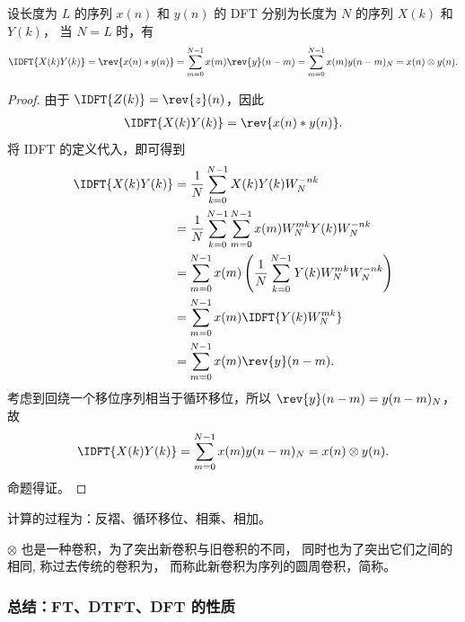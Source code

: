 \begin{property}
    设长度为 $L$ 的序列 $x(n)$ 和 $y(n)$ 的 DFT 分别为长度为 $N$ 的序列 $X(k)$ 和 $Y(k)$，
    当 $N = L$ 时，有
    \begin{align*}
        \IDFT{X(k)Y(k)} = \rev{x(n) * y(n)}
        = \sum_{m = 0}^{N - 1}x(m)\rev{y}(n - m)
        = \sum_{m = 0}^{N - 1}x(m)y(n - m)_N = x(n) \otimes y(n).
    \end{align*}
\end{property}

\begin{proof}
    由于 $\IDFT{Z(k)} = \rev{z}(n)$，因此
    \begin{align*}
        \IDFT{X(k)Y(k)} = \rev{x(n) * y(n)}.
    \end{align*}
    将 IDFT 的定义代入，即可得到
    \begin{align*}
        \IDFT{X(k)Y(k)} & = \frac{1}{N}\sum_{k = 0}^{N - 1}X(k)Y(k)W_N^{-nk} \\
        & = \frac{1}{N}\sum_{k = 0}^{N - 1}\sum_{m = 0}^{N - 1}x(m)W_N^{mk}Y(k)W_N^{-nk} \\
        & = \sum_{m = 0}^{N - 1}x(m)\left(\frac{1}{N}\sum_{k = 0}^{N - 1}Y(k)W_N^{mk}W_N^{-nk}\right) \\
        & = \sum_{m = 0}^{N - 1}x(m)\IDFT{Y(k)W_N^{mk}} \\
        & = \sum_{m = 0}^{N - 1}x(m)\rev{y}(n - m).
    \end{align*}
    考虑到回绕一个移位序列相当于循环移位，所以 $\rev{y}(n - m) = y(n - m)_N$，故
    \begin{align*}
        \IDFT{X(k)Y(k)} = \sum_{m = 0}^{N - 1}x(m)y(n - m)_N = x(n) \otimes y(n).
    \end{align*}
    命题得证。
\end{proof}

\begin{remark}
    计算的过程为：反褶、循环移位、相乘、相加。

    $\otimes$ 也是一种卷积，为了突出新卷积与旧卷积的不同，
    同时也为了突出它们之间的相同, 称过去传统的卷积为，
    而称此新卷积为序列的圆周卷积，简称。
\end{remark}

\subsubsection{总结：FT、DTFT、DFT 的性质}

